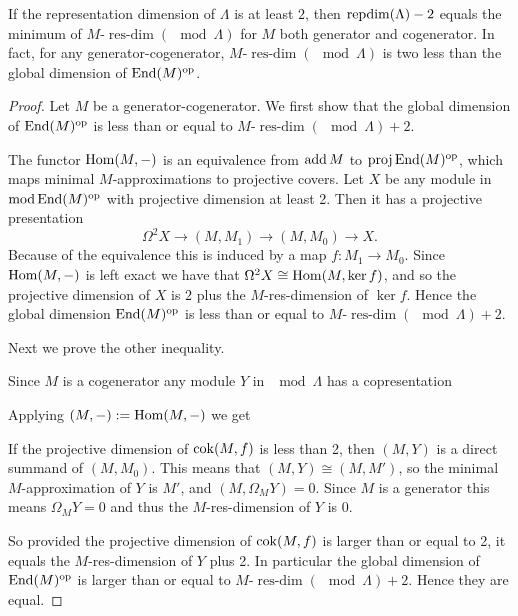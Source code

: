 \begin{prop}
	If the representation dimension of $\Lambda$ is at least $2$, then $\operatorname{repdim}(\Lambda) - 2$ equals the minimum of $M$-$\operatorname{res-dim}(\mod \Lambda)$ for $M$ both generator and cogenerator. In fact, for any generator-cogenerator, $M$-$\operatorname{res-dim}(\mod \Lambda)$ is two less than the global dimension of $\operatorname{End}(M)^{\operatorname{op}}$.
	
	\begin{proof}
		Let $M$ be a generator-cogenerator. We first show that the global dimension of $\operatorname{End}(M)^{\operatorname{op}}$ is less than or equal to $M$-$\operatorname{res-dim}(\mod \Lambda) + 2$. 
		
		The functor $\operatorname{Hom}(M, -)$ is an equivalence from $\operatorname{add} M$ to $\operatorname{proj}\operatorname{End}(M)^{\operatorname{op}}$, which maps minimal $M$-approximations to projective covers. Let $X$ be any module in $\operatorname{mod}\operatorname{End}(M)^{\operatorname{op}}$ with projective dimension at least 2. Then it has a projective presentation $$\Omega^2X \to (M,M_1) \to (M,M_0) \to X.$$
		Because of the equivalence this is induced by a map $f\colon M_1\to M_0$. Since $\operatorname{Hom}(M,-)$ is left exact we have that $\Omega^2X \cong \operatorname{Hom}(M, \ker f)$, and so the projective dimension of $X$ is $2$ plus the $M$-res-dimension of $\ker f$. Hence the global dimension $\operatorname{End}(M)^{\operatorname{op}}$ is less than or equal to $M$-$\operatorname{res-dim}(\mod \Lambda) + 2$. 
		
		Next we prove the other inequality.
		
		Since $M$ is a cogenerator any module $Y$ in $\mod\Lambda$ has a copresentation 
		\begin{center}
		\end{center}
		Applying $(M,-) := \operatorname{Hom}(M,-)$ we get
		\begin{center}
		\end{center}
		If the projective dimension of $\operatorname{cok}(M,f)$ is less than 2, then $(M, Y)$ is a direct summand of $(M, M_0)$. This means that $(M,Y) \cong (M, M')$, so the minimal $M$-approximation of $Y$ is $M'$, and $(M, \Omega_M Y) = 0$. Since $M$ is a generator this means $\Omega_M Y = 0$ and thus the $M$-res-dimension of $Y$ is 0.
		
		So provided the projective dimension of $\operatorname{cok}(M,f)$ is larger than or equal to 2, it equals the $M$-res-dimension of $Y$ plus 2. In particular the global dimension of $\operatorname{End}(M)^{\operatorname{op}}$ is larger than or equal to $M$-$\operatorname{res-dim}(\mod \Lambda) + 2$. Hence they are equal.
	\end{proof}
\end{prop}

